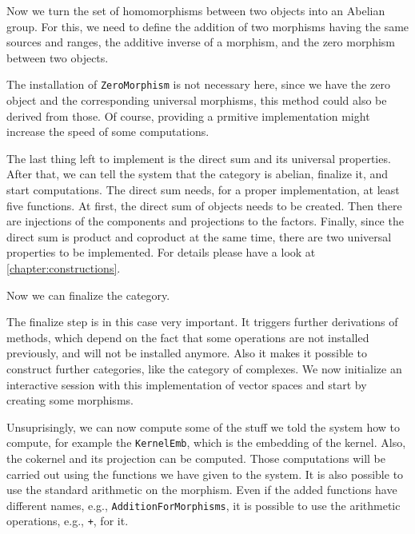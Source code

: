 

Now we turn the set of homomorphisms between two objects into an Abelian group. For this, we need to define the addition of
two morphisms having the same sources and ranges, the additive inverse of a morphism, and the zero morphism between two objects.



The installation of \texttt{ZeroMorphism} is not necessary here, since we have the zero object and the corresponding
universal morphisms, this method could also be derived from those. Of course, providing a prmitive implementation might
increase the speed of some computations.

The last thing left to implement is the direct sum and its universal properties. After that, we can tell the system that the
category is abelian, finalize it, and start computations. The direct sum needs, for a proper implementation, at least five
functions. At first, the direct sum of objects needs to be created. Then there are injections of the components and projections
to the factors. Finally, since the direct sum is product and coproduct at the same time, there are two universal properties to be implemented.
For details please have a look at \ref{chapter:constructions}.



Now we can finalize the category.



The finalize step is in this case very important. It triggers further derivations of methods, which depend on the fact that
some operations are not installed previously, and will not be installed anymore. Also it makes it possible to construct further
categories, like the category of complexes. We now initialize an interactive session with this implementation of vector spaces
and start by creating some morphisms.

\begin{small}

\end{small}

Unsuprisingly, we can now compute some of the stuff we told the system how to compute, for example the \texttt{KernelEmb},
which is the embedding of the kernel. Also, the cokernel and its projection can be computed. Those computations will
be carried out using the functions we have given to the system. It is also possible to use the standard arithmetic on the morphism.
Even if the added functions have different names, e.g., \texttt{AdditionForMorphisms}, it is possible to use the \GAP arithmetic
operations, e.g., \texttt{+}, for it.

